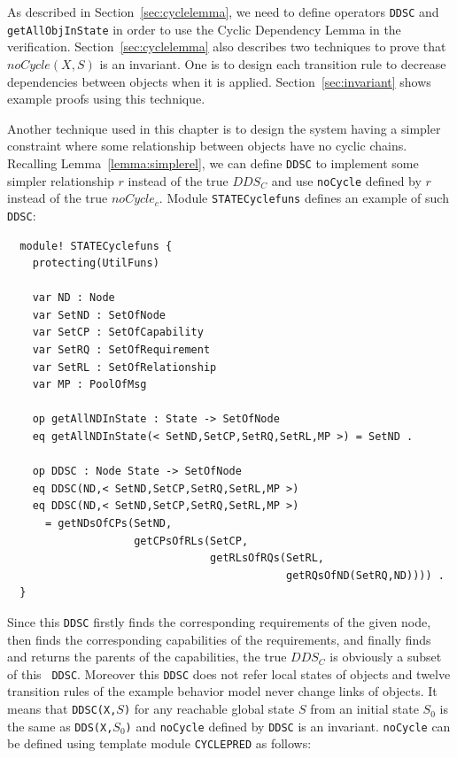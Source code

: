 \documentclass[12pt]{report}
\newcommand{\stt}[1]{{\small{\tt {#1}}}}
\begin{document}
As described in Section~\ref{sec:cyclelemma}, we need to define
operators {\tt DDSC} and {\tt getAllObjInState} in order to use the
Cyclic Dependency Lemma in the
verification. Section~\ref{sec:cyclelemma} also describes two
techniques to prove that $noCycle(X,S)$ is an invariant. One is to
design each transition rule to decrease dependencies between objects
when it is applied. Section~\ref{sec:invariant} shows example proofs
using this technique.

Another technique used in this chapter is to design the system having
a simpler constraint where some relationship between objects have no
cyclic chains. Recalling Lemma~\ref{lemma:simplerel}, we can define
{\tt DDSC} to implement some simpler relationship $r$ instead of the
true $DDS_C$ and use {\tt noCycle} defined by $r$ instead of the true
$noCycle_c$. Module {\tt STATECyclefuns} defines an example of such
{\tt DDSC}:
\small
\begin{verbatim}
  module! STATECyclefuns {
    protecting(UtilFuns)
  
    var ND : Node
    var SetND : SetOfNode
    var SetCP : SetOfCapability
    var SetRQ : SetOfRequirement
    var SetRL : SetOfRelationship
    var MP : PoolOfMsg
  
    op getAllNDInState : State -> SetOfNode
    eq getAllNDInState(< SetND,SetCP,SetRQ,SetRL,MP >) = SetND .
  
    op DDSC : Node State -> SetOfNode
    eq DDSC(ND,< SetND,SetCP,SetRQ,SetRL,MP >)
    eq DDSC(ND,< SetND,SetCP,SetRQ,SetRL,MP >)
      = getNDsOfCPs(SetND,
                    getCPsOfRLs(SetCP,
                                getRLsOfRQs(SetRL,
                                            getRQsOfND(SetRQ,ND)))) .
  }
\end{verbatim}
\normalsize
Since this {\tt DDSC} firstly finds the corresponding requirements of
the given node, then finds the corresponding capabilities of the
requirements, and finally finds and returns the parents of the
capabilities, the true $DDS_C$ is obviously a subset of this {\tt
  DDSC}.  Moreover this {\tt DDSC} does not refer local states of
objects and twelve transition rules of the example behavior model
never change links of objects. It means that \stt{DDSC(X,$S$)} for any
reachable global state $S$ from an initial state $S_0$ is the same as
\stt{DDS(X,$S_0$)} and {\tt noCycle} defined by {\tt DDSC} is an
invariant. {\tt noCycle} can be defined using template module {\tt CYCLEPRED}
as follows:
\end{document}
